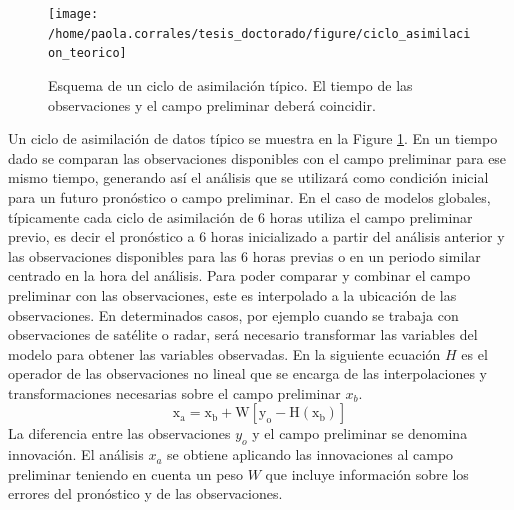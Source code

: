 \documentclass[12pt,twoside]{reedthesis}
\begin{document}
\begin{figure}

{\centering \texttt{[image: /home/paola.corrales/tesis\_doctorado/figure/ciclo\_asimilacion\_teorico]} 

}

\caption{Esquema de un ciclo de asimilación típico. El tiempo de las observaciones y el campo preliminar deberá coincidir.}\label{fig:ciclo-asimilacion-teorico}
\end{figure}
Un ciclo de asimilación de datos típico se muestra en la Figure \ref{fig:ciclo-asimilacion-teorico}. En un tiempo dado se comparan las observaciones disponibles con el campo preliminar para ese mismo tiempo, generando así el análisis que se utilizará como condición inicial para un futuro pronóstico o campo preliminar. En el caso de modelos globales, típicamente cada ciclo de asimilación de 6 horas utiliza el campo preliminar previo, es decir el pronóstico a 6 horas inicializado a partir del análisis anterior y las observaciones disponibles para las 6 horas previas o en un periodo similar centrado en la hora del análisis.
Para poder comparar y combinar el campo preliminar con las observaciones, este es interpolado a la ubicación de las observaciones. En determinados casos, por ejemplo cuando se trabaja con observaciones de satélite o radar, será necesario transformar las variables del modelo para obtener las variables observadas. En la siguiente ecuación \(H\) es el operador de las observaciones no lineal que se encarga de las interpolaciones y transformaciones necesarias sobre el campo preliminar \(x_b\).
\begin{equation}
  \mathrm{x_a = x_b + W[y_o - H(x_b )]}
  \label{eq:eq1}
\end{equation}
La diferencia entre las observaciones \(y_o\) y el campo preliminar se denomina innovación. El análisis \(x_a\) se obtiene aplicando las innovaciones al campo preliminar teniendo en cuenta un peso \(W\) que incluye información sobre los errores del pronóstico y de las observaciones.
\end{document}
